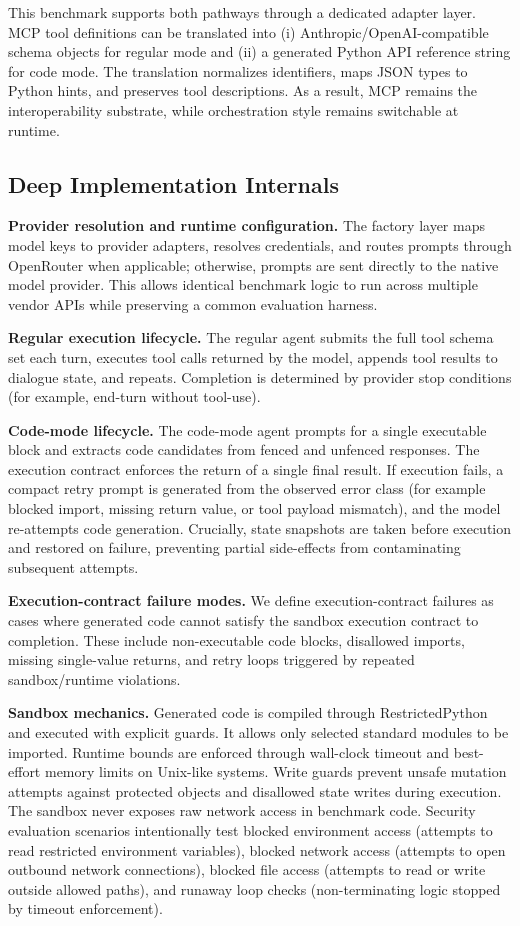 \documentclass[journal,article,submit,pdftex,moreauthors]{Definitions/mdpi}
\begin{document}
This benchmark supports both pathways through a dedicated adapter layer. MCP tool definitions can be translated into (i) Anthropic/OpenAI-compatible schema objects for regular mode and (ii) a generated Python API reference string for code mode. The translation normalizes identifiers, maps JSON types to Python hints, and preserves tool descriptions. As a result, MCP remains the interoperability substrate, while orchestration style remains switchable at runtime.

\subsection{Deep Implementation Internals}

\textbf{Provider resolution and runtime configuration.} The factory layer maps model keys to provider adapters, resolves credentials, and routes prompts through OpenRouter when applicable; otherwise, prompts are sent directly to the native model provider. This allows identical benchmark logic to run across multiple vendor APIs while preserving a common evaluation harness.

\textbf{Regular execution lifecycle.} The regular agent submits the full tool schema set each turn, executes tool calls returned by the model, appends tool results to dialogue state, and repeats. Completion is determined by provider stop conditions (for example, end-turn without tool-use).

\textbf{Code-mode lifecycle.} The code-mode agent prompts for a single executable block and extracts code candidates from fenced and unfenced responses. The execution contract enforces the return of a single final result. If execution fails, a compact retry prompt is generated from the observed error class (for example blocked import, missing return value, or tool payload mismatch), and the model re-attempts code generation. Crucially, state snapshots are taken before execution and restored on failure, preventing partial side-effects from contaminating subsequent attempts.

\textbf{Execution-contract failure modes.} We define execution-contract failures as cases where generated code cannot satisfy the sandbox execution contract to completion. These include non-executable code blocks, disallowed imports, missing single-value returns, and retry loops triggered by repeated sandbox/runtime violations.

\textbf{Sandbox mechanics.} Generated code is compiled through RestrictedPython \cite{ref-restrictedpython} and executed with explicit guards. It allows only selected standard modules to be imported. Runtime bounds are enforced through wall-clock timeout and best-effort memory limits on Unix-like systems. Write guards prevent unsafe mutation attempts against protected objects and disallowed state writes during execution. The sandbox never exposes raw network access in benchmark code. Security evaluation scenarios intentionally test blocked environment access (attempts to read restricted environment variables), blocked network access (attempts to open outbound network connections), blocked file access (attempts to read or write outside allowed paths), and runaway loop checks (non-terminating logic stopped by timeout enforcement).
\end{document}

